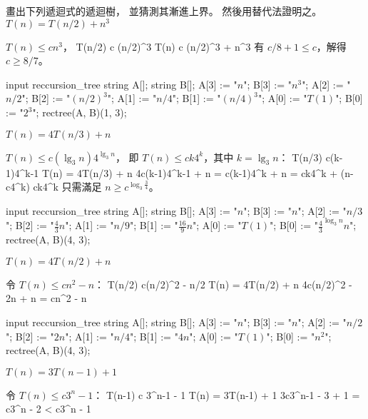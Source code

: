 \startsection[
  title={The recursion-tree method for solving recurrences},
]

\startEXERCISE
畫出下列遞迴式的遞迴樹，
並猜測其漸進上界。
然後用替代法證明之。
\startigBase[a]
\startitem
$T(n)=T(n/2)+n^3$

\startANSWER
$T(n)\le c n^3$，
\startformula\startmathalignment
\NC T(n/2) \NC \le c (n/2)^3 \NR
\NC T(n) \NC \le c (n/2)^3 + n^3 \NR
\stopmathalignment\stopformula
有 $c/8 + 1\le c$，解得 $c\ge 8/7$。

\startMPcode
	input reccursion_tree
	string A[];
	string B[];
	A[3] := "$n$";		B[3] := "$n^3$";
	A[2] := "$n/2$";	B[2] := "$(n/2)^3$";
	A[1] := "$n/4$";	B[1] := "$(n/4)^3$";
	A[0] := "$T(1)$";	B[0] := "$2^3$";
	rectree(A, B)(1, 3);
\stopMPcode
\stopANSWER
\stopitem

\startitem
$T(n)=4T(n/3)+n$

\startANSWER
$T(n)\le c (\lg_3 n)4^{\lg_3 n}$，
即 $T(n)\le c k 4^k$，其中 $k=\lg_3 n$：
\startformula\startmathalignment
\NC T(n/3) \NC \le c(k-1)4^{k-1} \NR
\NC T(n) \NC = 4T(n/3) + n \NR
\NC \NC \le 4c(k-1)4^{k-1} + n \NR
\NC \NC = c(k-1)4^k + n \NR
\NC \NC = ck4^k + (n-c4^k) \NR
\NC \NC \le ck4^k \qquad {}\NR
\stopmathalignment\stopformula
只需滿足 $n\ge c^{\log_{3}\frac{3}{4}}$。

\startMPcode
	input reccursion_tree
	string A[];
	string B[];
	A[3] := "$n$";		B[3] := "$n$";
	A[2] := "$n/3$";	B[2] := "$\frac{4}{3}n$";
	A[1] := "$n/9$";	B[1] := "$\frac{16}{9}n$";
	A[0] := "$T(1)$";	B[0] := "$\frac{4}{3}^{\log_3 n}n$";
	rectree(A, B)(4, 3);
\stopMPcode
\stopANSWER
\stopitem

\startitem
$T(n)=4T(n/2)+n$

\startANSWER
令 $T(n)\le c n^2 - n$：
\startformula\startmathalignment
\NC T(n/2) \NC \le c(n/2)^2 - n/2 \NR
\NC T(n) \NC = 4T(n/2) + n \NR
\NC \NC \le 4c(n/2)^2 - 2n + n \NR
\NC \NC = cn^2 - n \NR
\stopmathalignment\stopformula

\startMPcode
	input reccursion_tree
	string A[];
	string B[];
	A[3] := "$n$";		B[3] := "$n$";
	A[2] := "$n/2$";	B[2] := "$2n$";
	A[1] := "$n/4$";	B[1] := "$4n$";
	A[0] := "$T(1)$";	B[0] := "$n^2$";
	rectree(A, B)(4, 3);
\stopMPcode
\stopANSWER
\stopitem

\startitem
$T(n)=3T(n-1)+1$

\startANSWER
令 $T(n)\le c 3^n - 1$：
\startformula\startmathalignment
\NC T(n-1) \NC \le c 3^{n-1} - 1 \NR
\NC T(n) \NC = 3T(n-1) + 1 \NR
\NC \NC \le 3c3^{n-1} - 3 + 1 \NR
\NC \NC = c3^n - 2 \NR
\NC \NC < c3^n - 1 \NR
\stopmathalignment\stopformula

